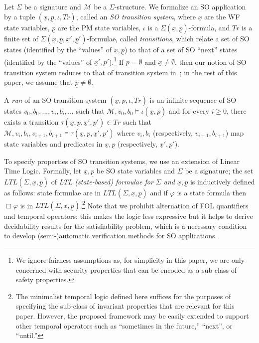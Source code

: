 \documentclass[conference]{IEEEtran}
\begin{document}
Let $\Sigma$ be a signature and $\mathcal{M}$ be a $\Sigma$-structure.
We formalize an SO application by a tuple
$(\underline{x},\underline{p}, \iota, \mathit{Tr})$, called an
\emph{SO transition system}, where $\underline{x}$ are the WF state
variables, $\underline{p}$ are the PM state variables, $\iota$ is a
$\Sigma(\underline{x},\underline{p})$-formula, and $\mathit{Tr}$ is a
finite set of
$\Sigma(\underline{x},\underline{p},\underline{x}',\underline{p}')$-formulae,
called \emph{transitions}, which relate a set of SO states (identified
by the ``values'' of $\underline{x},\underline{p}$) to that of a set
of SO ``next'' states (identified by the ``values'' of
$\underline{x}',\underline{p}'$).\footnote{We ignore fairness
  assumptions as, for simplicity in this paper, we are only concerned
  with security properties that can be encoded as a sub-class of
  safety properties.}  If $\underline{p}=\emptyset$ and
$\underline{x}\neq \emptyset$, then our notion of SO transition system
reduces to that of transition system in~\cite{manna-pnueli-book}; in
the rest of this paper, we assume that $\underline{p}\neq \emptyset$.

A \emph{run} of an SO transition system $(\underline{x},\underline{p},
\iota, \mathit{Tr})$ is an infinite sequence of SO states $v_0,b_0,
..., v_i,b_i, ...$ such that $\mathcal{M}, v_0,b_0 \models
\iota(\underline{x},\underline{p})$ and for every $i\geq 0$, there
exists a transition
$\tau(\underline{x},\underline{p},\underline{x}',\underline{p}')\in
\mathit{Tr}$ such that $\mathcal{M}, v_i,b_i,v_{i+1},b_{i+1} \models
\tau(\underline{x},\underline{p},\underline{x}',\underline{p}')$ where
$v_i,b_i$ (respectively, $v_{i+1},b_{i+1}$) map state variables and predicates in
$\underline{x},\underline{p}$ (respectively, $\underline{x}',\underline{p}'$).

To specify properties of SO transition systems, we use an extension of
Linear Time Logic. Formally, let
$\underline{x},\underline{p}$ be SO state variables and $\Sigma$ be a
signature; the set $\mathit{LTL}(\Sigma,\underline{x},\underline{p})$
of \emph{LTL (state-based) formulae for $\Sigma$ and
  $\underline{x},\underline{p}$} is inductively defined as
follows:
state formulae are in $\mathit{LTL}(\Sigma,\underline{x},\underline{p})$ and if $\varphi$ is
a state formula then $\Box \varphi$ is in
$\mathit{LTL}(\Sigma,\underline{x},\underline{p})$.\footnote{The
  minimalist temporal logic defined here suffices for the purposes of
  specifying the sub-class of invariant properties that are relevant
  for this paper.  However, the proposed framework may be easily
  extended to support other temporal operators such as ``sometimes in
  the future,'' ``next'', or ``until.''} Note that we prohibit
alternation of FOL quantifiers and temporal operators: this makes the
logic less expressive but it helps to derive decidability results for
the satisfiability problem, which is a necessary condition to develop
(semi-)automatic verification methods for SO applications.
\end{document}
